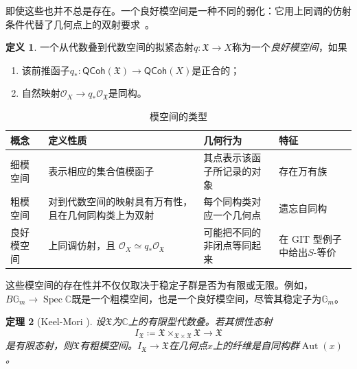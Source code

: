 \documentclass{amsart}
\newtheorem{thm}{定理}[section]
\theoremstyle{definition}
\newtheorem{defn}[thm]{定义}
\theoremstyle{remark}
\theoremstyle{plain}
\theoremstyle{definition}
\theoremstyle{remark}
\newcommand{\G}{\mathbb{G}}
\newcommand{\C}{\mathbb{C}}
\newcommand{\mc}[1]{\mathcal{#1}}
\newcommand{\mf}[1]{\mathfrak{#1}}
\newcommand{\on}[1]{\operatorname{#1}}
\newcommand{\ms}[1]{\mathsf{#1}}
\newcommand{\1}{\mathbf{1}}
\newcommand{\2}{\mathbf{2}}
\newcommand{\3}{\mathbf{3}}
\begin{document}
即使这些也并不总是存在。一个良好模空间是一种不同的弱化：它用上同调的仿射条件代替了几何点上的双射要求~\cite{Alper2013}。

\begin{defn}
一个从代数叠到代数空间的拟紧态射\(q\colon\mf{X}\to X\)称为一个\textit{良好模空间}，如果
    \begin{enumerate}
        \item 该前推函子\(q_*\colon\ms{QCoh}(\mf{X})\to\ms{QCoh}(X)\)是正合的；
\item 自然映射\(\mc{O}_X\to q_*\mc{O}_{\mf{X}}\)是同构。
    \end{enumerate}
\end{defn}

\begin{table}[htpb]
    \centering
    \caption{模空间的类型}
    \label{tab:moduli-types-corrected}
    \renewcommand{\arraystretch}{1.3}
    \begin{tabular}{
        p{}
        p{}
        p{}
        p{}
}
        \toprule
        \textbf{概念}
        & \textbf{定义性质}
        & \textbf{几何行为}
        & \textbf{特征}
        \\
        \midrule
        细模空间
        & 表示相应的集合值模函子
        & 其点表示该函子所记录的对象
        & 存在万有族
        \\
        粗模空间
        & 对到代数空间的映射具有万有性，且在几何同构类上为双射
        & 每个同构类对应一个几何点
        & 遗忘自同构
        \\
        良好模空间
        & 上同调仿射，且
          \(\mc{O}_X \simeq q_*\mc{O}_{\mf{X}}\)
        & 可能把不同的非闭点等同起来
        & 在 GIT 型例子中给出\(S\)-等价
        \\
        \bottomrule
    \end{tabular}
\end{table}

这些模空间的存在性并不仅仅取决于稳定子群是否为有限或无限。例如，\(B\G_m\to\on{Spec}\C\)既是一个粗模空间，也是一个良好模空间，尽管其稳定子为\(\G_m\)。

\begin{thm}[Keel-Mori {\cite{KeelMori1997}}]
设\(\mf{X}\)为\(\C\)上的有限型代数叠。若其惯性态射
    \[
        I_{\mf{X}}
        \coloneqq
        \mf{X}\times_{\mf{X}\times\mf{X}}\mf{X}
        \longrightarrow \mf{X}
    \]
是有限态射，则\(\mf{X}\)有粗模空间。\(I_{\mf{X}}\to\mf{X}\)在几何点\(x\)上的纤维是自同构群\(\on{Aut}(x)\)。
\end{thm}
\end{document}
